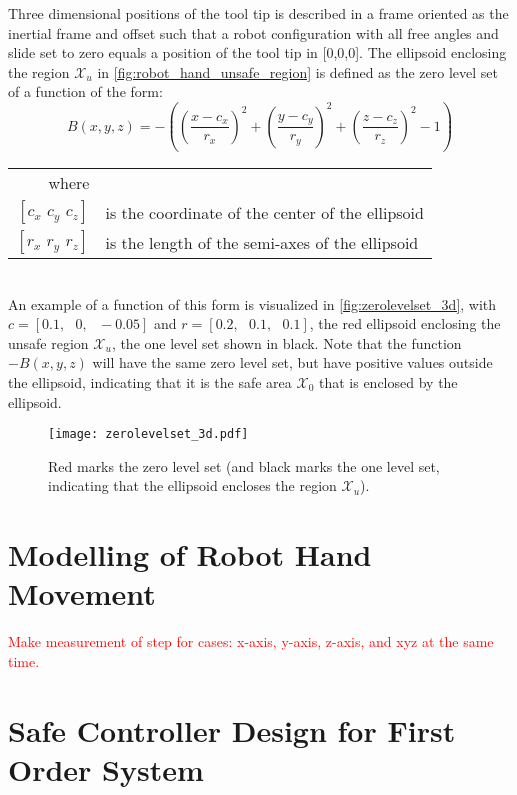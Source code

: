 Three dimensional positions of the tool tip is described in a frame oriented as the inertial frame and offset such that a robot configuration with all free angles and slide set to zero equals a position of the tool tip in [0,0,0].
The ellipsoid enclosing the region $\mathcal{X}_u$ in \autoref{fig:robot_hand_unsafe_region} is defined as the zero level set of a function of the form:
\begin{equation}
B(x,y,z) = -\left(  \left(\frac{x-c_x}{r_x}\right)^2 + \left(\frac{y-c_y}{r_y}\right)^2 + \left(\frac{z-c_z}{r_z}\right)^2 - 1 \right)
\end{equation}
\begin{tabular}{rl}
where&\\
$[c_x\,\, c_y\,\, c_z]$ & is the coordinate of the center of the ellipsoid\\
$[r_x\,\, r_y\,\, r_z]$ & is the length of the semi-axes of the ellipsoid\\
\end{tabular}\\

An example of a function of this form is visualized in \autoref{fig:zerolevelset_3d}, with $c= [0.1,\,\,\,\, 0,\,\,\,\, -0.05]$ and $r=[0.2,\,\,\,\, 0.1,\,\,\,\, 0.1]$, the red ellipsoid enclosing the unsafe region $\mathcal{X}_u$, the one level set shown in black. Note that the function $-B(x,y,z)$ will have the same zero level set, but have positive values outside the ellipsoid, indicating that it is the safe area $\mathcal{X}_0$ that is enclosed by the ellipsoid.

\begin{figure}[htbp]
\centering
\hspace*{-15mm}
\texttt{[image: zerolevelset\_3d.pdf]}
\caption{Red marks the zero level set (and black marks the one level set, indicating that the ellipsoid encloses the region $\mathcal{X}_u$).}
\label{fig:zerolevelset_3d}
\end{figure}


\section{Modelling of Robot Hand Movement}
\textcolor{red}{Make measurement of step for cases: x-axis, y-axis, z-axis, and xyz at the same time.}

\section{Safe Controller Design for First Order System}


